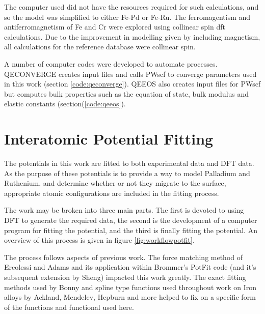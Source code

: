 The computer used did not have the resources required for such calculations, and so the model was simplified to either Fe-Pd or Fe-Ru.  The ferromagentism and antiferromagnetism of Fe and Cr were explored using collinear spin \acrshort{dft} calculations.  Due to the improvement in modelling given by including magnetism, all calculations for the reference database were collinear spin.

A number of computer codes were developed to automate processes.  QECONVERGE creates input files and calls PWscf to converge parameters used in this work (section \ref{code:qeconverge}).  QEEOS also creates input files for PWscf but computes bulk properties such as the equation of state, bulk modulus and elastic constants (section(\ref{code:qeeos}).

\section{Interatomic Potential Fitting}

The potentials in this work are fitted to both experimental data and DFT data.  As the purpose of these potentials is to provide a way to model Palladium and Ruthenium, and determine whether or not they migrate to the surface, appropriate atomic configurations are included in the fitting process.

The work may be broken into three main parts.  The first is devoted to using DFT to generate the required data, the second is the development of a computer program for fitting the potential, and the third is finally fitting the potential.  An overview of this process is given in figure \ref{fig:workflowpotfit}.

The process follows aspects of previous work.  The force matching method of Ercolessi and Adams\cite{forcematchingmethod} and its application within Brommer's PotFit code\cite{pbrommer} (and it's subsequent extension by Sheng\cite{shengeam}) impacted this work greatly.  The exact fitting methods used by Bonny and spline type functions used throughout work on Iron alloys by Ackland, Mendelev, Hepburn and more helped to fix on a specific form of the functions and functional used here.

